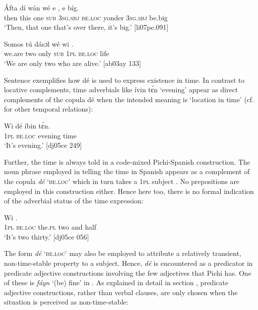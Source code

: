 \ea%
    \label{ex:key:782}
    \gll \'{A}fta    dí  wán  wé  e        ,  e    bíg.\\
then  this  one  \textsc{sub}  \textsc{3sg.sbj}  \textsc{be.loc}  yonder  \textsc{3sg.sbj}  be.big\\

\glt ‘Then, that one that’s over there, it’s big.’ [li07pe.091]
\z


\ea%
    \label{ex:key:783}
    \gll Somos  tú  dásɔl  wé  wi      .\\
we.are  two  only    \textsc{sub}  \textsc{1pl}  \textsc{be.loc}  life\\

\glt ‘We are only two who are alive.’ [ab03ay 133]
\z

Sentence  exemplifies how dé is used to express existence in time. In contrast to locative complements, time adverbials like ívin tɛ́n ‘evening’ appear as direct complements of the copula dé when the intended meaning is ‘location{\fff} in time’ (cf.  for other temporal relations): 


\ea%
    \label{ex:key:784}
    \gll Wi  dé    íbin    tɛ́n.\\
\textsc{1pl}  \textsc{be.loc}  evening  time\\

\glt ‘It’s evening.’ [dj05ce 249]
\z

Further, the time is always told in a code-mixed Pichi-Spanish construction. The noun phrase employed in telling the time in Spanish appears as a complement of the copula \textit{dé} ‘\textsc{be.loc}’ which in turn takes a \textsc{1pl} subject . No prepositions are employed in this construction either. Hence here too, there is no formal indication of the adverbial status of the time expression:


\ea%
    \label{ex:key:785}
    \gll Wi              .\\
\textsc{1pl}  \textsc{be.loc}  the\textsc{.pl}  two  and  half\\

\glt ‘It’s two thirty.’ [dj05ce 056]
\z

The form \textit{dé} ‘\textsc{be.loc}’ may also be employed to attribute a relatively transient, non-time-stable property to a subject. Hence, \textit{dé} is encountered as a predicator in predicate adjective constructions involving the few adjectives that Pichi has. One of these is \textit{fáyn} ‘(be) fine’ in . As explained in detail in section , predicate adjective constructions, rather than verbal clauses, are only chosen when the situation is perceived as non-time-stable:


